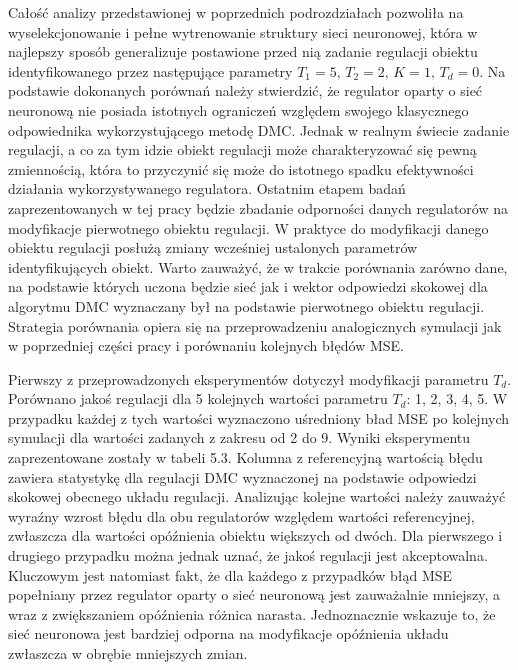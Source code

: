 \par Całość analizy przedstawionej w poprzednich podrozdziałach pozwoliła na wyselekcjonowanie i pełne wytrenowanie struktury sieci neuronowej, która w najlepszy sposób generalizuje postawione przed nią zadanie regulacji obiektu identyfikowanego przez następujące parametry \( T_1=5, \, T_2=2, \, K=1, \, T_d=0 \). Na podstawie dokonanych porównań należy stwierdzić, że regulator oparty o sieć neuronową nie posiada istotnych ograniczeń względem swojego klasycznego odpowiednika wykorzystującego metodę DMC. Jednak w realnym świecie zadanie regulacji, a co za tym idzie obiekt regulacji może charakteryzować się pewną zmiennością, która to przyczynić się może do istotnego spadku efektywności działania wykorzystywanego regulatora. Ostatnim etapem badań zaprezentowanych w tej pracy będzie zbadanie odporności danych regulatorów na modyfikacje pierwotnego obiektu regulacji. W praktyce do modyfikacji danego obiektu regulacji posłużą zmiany wcześniej ustalonych parametrów identyfikujących obiekt. Warto zauważyć, że w trakcie porównania zarówno dane, na podstawie których uczona będzie sieć jak i wektor odpowiedzi skokowej dla algorytmu DMC wyznaczany był na podstawie pierwotnego obiektu regulacji. Strategia porównania opiera się na przeprowadzeniu analogicznych symulacji jak w poprzedniej części pracy i porównaniu kolejnych błędów MSE.   

\par Pierwszy z przeprowadzonych eksperymentów dotyczył modyfikacji parametru \(T_d\). Porównano jakoś regulacji dla 5 kolejnych wartości parametru \(T_d\): 1, 2, 3, 4, 5. W przypadku każdej z tych wartości wyznaczono uśredniony bład MSE po kolejnych symulacji dla wartości zadanych z zakresu od 2 do 9. Wyniki eksperymentu zaprezentowane zostały w tabeli 5.3. Kolumna z referencyjną wartością błędu zawiera statystykę dla regulacji DMC wyznaczonej na podstawie odpowiedzi skokowej obecnego układu regulacji. Analizując kolejne wartości należy zauważyć wyraźny wzrost błędu dla obu regulatorów względem wartości referencyjnej, zwłaszcza dla wartości opóźnienia obiektu większych od dwóch. Dla pierwszego i drugiego przypadku można jednak uznać, że jakoś regulacji jest akceptowalna.  Kluczowym jest natomiast fakt, że dla każdego z przypadków błąd MSE popełniany przez regulator oparty o sieć neuronową jest zauważalnie mniejszy, a wraz z zwiększaniem opóźnienia różnica narasta. Jednoznacznie wskazuje to, że sieć neuronowa jest bardziej odporna na modyfikacje opóźnienia układu zwłaszcza w obrębie mniejszych zmian. 


